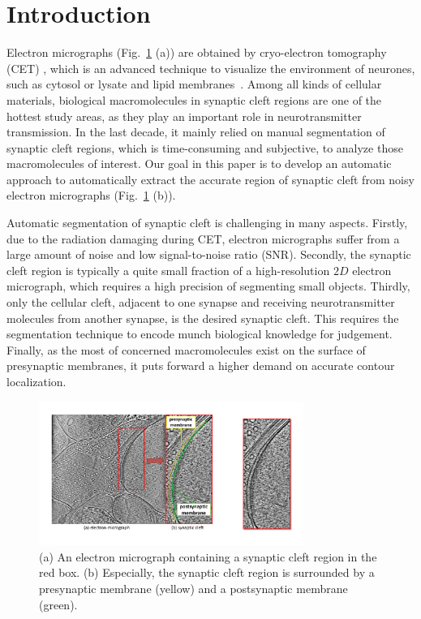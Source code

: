 \section{Introduction}
\label{sec:intro}
Electron micrographs (Fig.~\ref{fig:img} (a)) are obtained by cryo-electron tomography (CET) \cite{Hawkes2007}, which is an advanced technique to visualize the  environment of neurones, such as cytosol or lysate and lipid membranes~\cite{Lucic2005a}.
%
Among all kinds of cellular materials, biological macromolecules in synaptic cleft regions are one of the hottest study areas, as they play an important role in neurotransmitter transmission.
%
In the last decade, it mainly relied on manual segmentation of synaptic cleft regions, which is time-consuming and subjective, to analyze those macromolecules of interest.
%
Our goal in this paper is to develop an automatic approach to automatically extract the accurate region of synaptic cleft from noisy electron micrographs (Fig.~\ref{fig:img} (b)).


Automatic segmentation of synaptic cleft is challenging in many aspects. 
Firstly, due to the radiation damaging during CET, electron micrographs suffer from a large amount of noise and low signal-to-noise ratio (SNR).
Secondly, the synaptic cleft region is typically a quite small fraction of a high-resolution $2D$ electron micrograph, which requires a high precision of segmenting small objects.
Thirdly, only the cellular cleft, adjacent to one synapse and receiving neurotransmitter molecules from another synapse, is the desired synaptic cleft. This requires the segmentation technique to encode munch  biological knowledge for judgement.
Finally, as the most of concerned macromolecules exist on the surface of presynaptic membranes, it puts forward a higher demand on accurate contour localization.

\begin{figure}[t]
    \begin{center}
        \includegraphics[width=3.4in]{figs/FigImg.pdf}
   \end{center}
\caption{(a) An electron micrograph containing a synaptic cleft region in the red box. 
            (b) Especially, the synaptic cleft region is surrounded by a presynaptic membrane (yellow) and a postsynaptic membrane (green).  }
\label{fig:img}
\end{figure}


